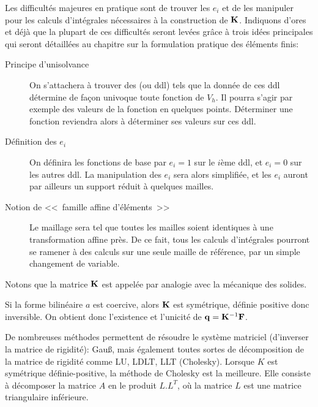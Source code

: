 \medskip
Les difficultés majeures en pratique sont de trouver les $e_i$ et de les manipuler
pour les calculs d'intégrales nécessaires à la construction de $\MM{K}$.
Indiquons d'ores et déjà que la plupart de ces difficultés seront levées
grâce à trois idées principales qui seront détaillées au chapitre sur
la formulation pratique des éléments finis:
\begin{description}
 \item[Principe d'unisolvance]

	On s'attachera à trouver des  (ou
	ddl) tels que la donnée de ces ddl détermine de façon univoque
	toute fonction de $V_h$.
	Il pourra s'agir par exemple des valeurs de la fonction en quelques points.
	Déterminer une fonction reviendra alors à déterminer ses valeurs sur ces ddl.
  \item[Définition des $e_i$]

	On définira les fonctions de base par $e_i = 1$ sur le $i$ème ddl, et
	$e_i = 0$ sur les autres ddl.
	La manipulation des $e_i$ sera alors simplifiée, et les $e_i$
	auront par ailleurs un support réduit à quelques mailles.

	\item[Notion de <<~famille affine d'éléments~>>]

	Le maillage sera tel que toutes les mailles soient identiques à une
	transformation affine près.
	De ce fait, tous les calculs d'intégrales pourront se ramener à
	des calculs sur une seule maille de référence, par un simple changement
	de variable.
\end{description}
\medskip
Notons que la matrice $\MM{K}$ est appelée  par
analogie avec la mécanique des solides.

\medskip
Si la forme bilinéaire $a$ est coercive, alors $\MM{K}$ est symétrique, définie positive
donc inversible. On obtient donc l'existence et l'unicité de $\VV{q} = \MMI{K}\VV{F}$.

De nombreuses méthodes permettent de résoudre le système matriciel (d'inverser la
matrice de rigidité): Gauß, mais également 
toutes sortes de décomposition de la matrice de rigidité comme LU, LDLT, LLT (Cholesky).
Lorsque $K$ est symétrique définie-positive, la méthode de Cholesky
est la meilleure. Elle consiste à décomposer la matrice $A$ en le produit $L.L^T$,
où la matrice $L$ est une matrice triangulaire inférieure.


